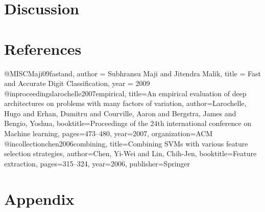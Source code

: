 \documentclass[10pt,twocolumn]{article}
\begin{document}
\section{Discussion}
\section{References}
@MISC{Maji09fastand,
    author = {Subhransu Maji and Jitendra Malik},
    title = {Fast and Accurate Digit Classification},
    year = {2009}
}
@inproceedings{larochelle2007empirical,
  title={An empirical evaluation of deep architectures on problems with many factors of variation},
  author={Larochelle, Hugo and Erhan, Dumitru and Courville, Aaron and Bergstra, James and Bengio, Yoshua},
  booktitle={Proceedings of the 24th international conference on Machine learning},
  pages={473--480},
  year={2007},
  organization={ACM}
}
@incollection{chen2006combining,
  title={Combining SVMs with various feature selection strategies},
  author={Chen, Yi-Wei and Lin, Chih-Jen},
  booktitle={Feature extraction},
  pages={315--324},
  year={2006},
  publisher={Springer}
}
\section{Appendix}
\end{document}
